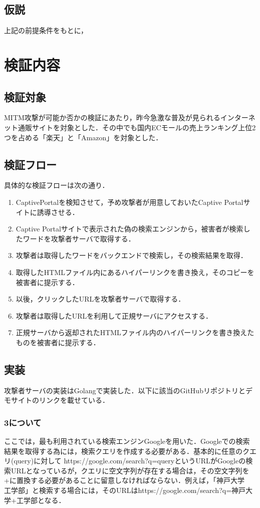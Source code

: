 \documentclass[dvipdfmx]{jsarticle}
\begin{document}
    \subsection{仮説}
    上記の前提条件をもとに，
    \section{検証内容}
    \subsection{検証対象}
    MITM攻撃が可能か否かの検証にあたり，昨今急激な普及が見られるインターネット通販サイトを対象とした．その中でも国内ECモールの売上ランキング上位2つを占める「楽天」と「Amazon」を対象とした．
    \subsection{検証フロー}
    具体的な検証フローは次の通り．
    \begin{enumerate}
        \item CaptivePortalを検知させて，予め攻撃者が用意しておいたCaptive Portalサイトに誘導させる．
        \item Captive Portalサイトで表示された偽の検索エンジンから，被害者が検索したワードを攻撃者サーバで取得する．
        \item 攻撃者は取得したワードをバックエンドで検索し，その検索結果を取得．
        \item 取得したHTMLファイル内にあるハイパーリンクを書き換え，そのコピーを被害者に提示する．
        \item 以後，クリックしたURLを攻撃者サーバで取得する．
        \item 攻撃者は取得したURLを利用して正規サーバにアクセスする．
        \item 正規サーバから返却されたHTMLファイル内のハイパーリンクを書き換えたものを被害者に提示する．
    \end{enumerate}
    \subsection{実装}
    攻撃者サーバの実装はGolangで実装した．以下に該当のGitHubリポジトリとデモサイトのリンクを載せている．
    \subsubsection{3について}
    ここでは，最も利用されている検索エンジンGoogleを用いた．Googleでの検索結果を取得する為には，検索クエリを作成する必要がある．基本的に任意のクエリ(query)に対して https://google.com/search?q=queryというURLがGoogleの検索URLとなっているが，クエリに空文字列が存在する場合は，その空文字列を+に置換する必要があることに留意しなければならない．例えば，「神戸大学　工学部」と検索する場合には，そのURLはhttps://google.com/search?q=神戸大学+工学部となる．
\end{document}
